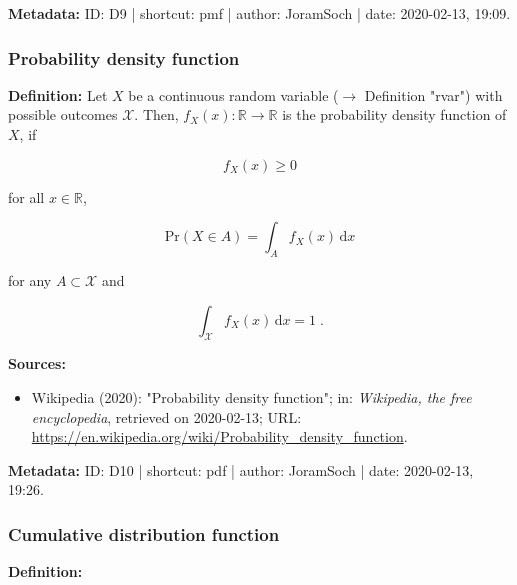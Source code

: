 \documentclass[a4paper,12pt]{book}
\begin{document}
\vspace{1em}
\textbf{Metadata:} ID: D9 | shortcut: pmf | author: JoramSoch | date: 2020-02-13, 19:09.


\subsubsection[\textit{Probability density function}]{Probability density function} \label{sec:pdf}

\vspace{1em}
\textbf{Definition:} Let $X$ be a continuous random variable ($\rightarrow$ Definition "rvar") with possible outcomes $\mathcal{X}$. Then, $f_X(x): \mathbb{R} \to \mathbb{R}$ is the probability density function of $X$, if

\begin{equation} \label{eq:pdf-pdf-def-s0}
f_X(x) \geq 0
\end{equation}

for all $x \in \mathbb{R}$,

\begin{equation} \label{eq:pdf-pdf-def-s1}
\mathrm{Pr}(X \in A) = \int_{A} f_X(x) \, \mathrm{d}x
\end{equation}

for any $A \subset \mathcal{X}$ and

\begin{equation} \label{eq:pdf-pdf-def-s2}
\int_{\mathcal{X}} f_X(x) \, \mathrm{d}x = 1 \; .
\end{equation}

\vspace{1em}
\textbf{Sources:}
\begin{itemize}
\item Wikipedia (2020): "Probability density function"; in: \textit{Wikipedia, the free encyclopedia}, retrieved on 2020-02-13; URL: \url{https://en.wikipedia.org/wiki/Probability_density_function}.
\end{itemize}


\vspace{1em}
\textbf{Metadata:} ID: D10 | shortcut: pdf | author: JoramSoch | date: 2020-02-13, 19:26.


\subsubsection[\textit{Cumulative distribution function}]{Cumulative distribution function} \label{sec:cdf}

\vspace{1em}
\textbf{Definition:}
\end{document}
